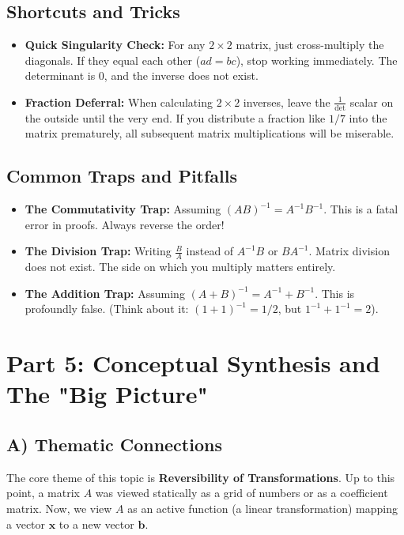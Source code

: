 \documentclass[11pt]{article}
\begin{document}
\subsection{Shortcuts and Tricks}
\begin{itemize}
    \item \textbf{Quick Singularity Check:} For any $2 \times 2$ matrix, just cross-multiply the diagonals. If they equal each other ($ad = bc$), stop working immediately. The determinant is 0, and the inverse does not exist.
    \item \textbf{Fraction Deferral:} When calculating $2 \times 2$ inverses, leave the $\frac{1}{\det}$ scalar on the outside until the very end. If you distribute a fraction like $1/7$ into the matrix prematurely, all subsequent matrix multiplications will be miserable.
\end{itemize}

\subsection{Common Traps and Pitfalls}
\begin{itemize}
    \item \textbf{The Commutativity Trap:} Assuming $(AB)^{-1} = A^{-1}B^{-1}$. This is a fatal error in proofs. Always reverse the order!
    \item \textbf{The Division Trap:} Writing $\frac{B}{A}$ instead of $A^{-1}B$ or $BA^{-1}$. Matrix division does not exist. The side on which you multiply matters entirely.
    \item \textbf{The Addition Trap:} Assuming $(A + B)^{-1} = A^{-1} + B^{-1}$. This is profoundly false. (Think about it: $(1+1)^{-1} = 1/2$, but $1^{-1} + 1^{-1} = 2$).
\end{itemize}

\newpage
\section{Part 5: Conceptual Synthesis and The "Big Picture"}

\subsection{A) Thematic Connections}
The core theme of this topic is \textbf{Reversibility of Transformations}. Up to this point, a matrix $A$ was viewed statically as a grid of numbers or as a coefficient matrix. Now, we view $A$ as an active function (a linear transformation) mapping a vector $\mathbf{x}$ to a new vector $\mathbf{b}$. 
\end{document}
